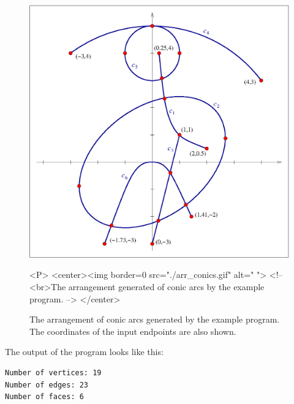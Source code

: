 \begin{figure}[h]
\begin{ccTexOnly}
{\centerline {\includegraphics{arr_conics.ps}}}
\end{ccTexOnly}
\caption{The arrangement of conic arcs generated by the example program.
The coordinates of the input endpoints are also shown.
\label{fig:conics}}
\begin{ccHtmlOnly}
<P>
<center><img border=0 src="./arr_conics.gif" alt=" ">
<!-- <br>The arrangement generated of conic arcs by the example program. -->
</center>
\end{ccHtmlOnly}
\end{figure}


The output of the program looks like this:
\begin{verbatim}
Number of vertices: 19
Number of edges: 23
Number of faces: 6
\end{verbatim}

